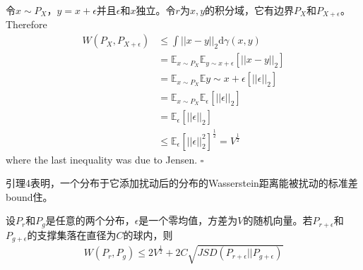             \begin{Proof}
            令$x\sim P_X$，$y = x+\epsilon$并且$\epsilon$和$x$独立。令$r$为$x,y$的积分域，它有边界$P_X$和$P_{X+\epsilon}$。Therefore
            \begin{align*}
            W(P_X,P_{X+\epsilon})& \leqslant \int ||x-y||_2\mathrm{d}\gamma(x,y)\\
            & = \mathbb{E}_{x\sim P_X}\mathbb{E}_{y\sim x+\epsilon} [||x-y||_2]\\
            &=\mathbb{E}_{x\sim P_X}\mathbb{E}{y\sim x+\epsilon}[||\epsilon||_2]\\
            &=\mathbb{E}_{x\sim P_X}\mathbb{E}_\epsilon [||\epsilon||_2]\\
            &=\mathbb{E}_\epsilon[||\epsilon||_2]\\
            & \leqslant \mathbb{E}_\epsilon[||\epsilon||_2^2]^{\frac{1}{2}} = V^{\frac{1}{2}}
            \end{align*}
            where the last inequality was due to Jensen. $\square$
            \end{Proof}
            引理4表明，一个分布于它添加扰动后的分布的Wasserstein距离能被扰动的标准差bound住。
            \begin{theorem}[Theorem 3.3]
            设$P_r$和$P_g$是任意的两个分布，$\epsilon$是一个零均值，方差为$V$的随机向量。若$P_{r+\epsilon}$和$P_{g+\epsilon}$的支撑集落在直径为$C$的球内，则
            \begin{align*}
            W(P_r,P_g) \leqslant 2 V^{\frac{1}{2}}+2C\sqrt{JSD(P_{r+\epsilon}||P_{g+\epsilon})}
            \end{align*}
            \end{theorem}
